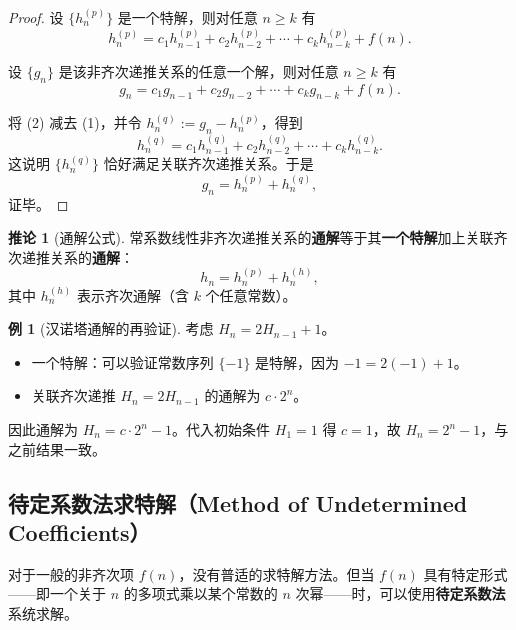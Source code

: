 \documentclass[UTF8,11pt,a4paper]{ctexbook}   %
\theoremstyle{definition}
\newtheorem{example}{例}[section]
\newtheorem{corollary}{推论}[section]
\begin{document}
\begin{proof}
设 $\{h_n^{(p)}\}$ 是一个特解，则对任意 $n\ge k$ 有
\[
h_n^{(p)} = c_1 h_{n-1}^{(p)} + c_2 h_{n-2}^{(p)} + \cdots + c_k h_{n-k}^{(p)} + f(n).
\tag{1}
\]

设 $\{g_n\}$ 是该非齐次递推关系的任意一个解，则对任意 $n\ge k$ 有
\[
g_n = c_1 g_{n-1} + c_2 g_{n-2} + \cdots + c_k g_{n-k} + f(n).
\tag{2}
\]

将 (2) 减去 (1)，并令 $h_n^{(q)} := g_n - h_n^{(p)}$，得到
\[
h_n^{(q)} = c_1 h_{n-1}^{(q)} + c_2 h_{n-2}^{(q)} + \cdots + c_k h_{n-k}^{(q)}.
\]
这说明 $\{h_n^{(q)}\}$ 恰好满足关联齐次递推关系。于是
\[
g_n = h_n^{(p)} + h_n^{(q)},
\]
证毕。
\end{proof}

\begin{corollary}[通解公式]
常系数线性非齐次递推关系的\textbf{通解}等于其\textbf{一个特解}加上关联齐次递推关系的\textbf{通解}：
\[
\boxed{h_n = h_n^{(p)} + h_n^{(h)}},
\]
其中 $h_n^{(h)}$ 表示齐次通解（含 $k$ 个任意常数）。
\end{corollary}

\begin{example}[汉诺塔通解的再验证]
考虑 $H_n = 2H_{n-1} + 1$。
\begin{itemize}
    \item 一个特解：可以验证常数序列 $\{-1\}$ 是特解，因为 $-1 = 2(-1) + 1$。
    \item 关联齐次递推 $H_n = 2H_{n-1}$ 的通解为 $c\cdot 2^n$。
\end{itemize}
因此通解为 $H_n = c\cdot 2^n - 1$。代入初始条件 $H_1 = 1$ 得 $c=1$，故 $H_n = 2^n - 1$，与之前结果一致。
\end{example}

\subsection{待定系数法求特解（Method of Undetermined Coefficients）}

对于一般的非齐次项 $f(n)$，没有普适的求特解方法。但当 $f(n)$ 具有特定形式——即一个关于 $n$ 的多项式乘以某个常数的 $n$ 次幂——时，可以使用\textbf{待定系数法}系统求解。
\end{document}
